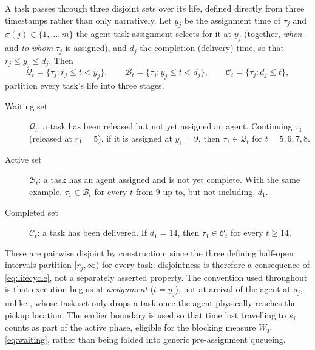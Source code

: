 \documentclass[../main.tex]{subfiles}
\begin{document}
A task passes through three disjoint sets over its life, defined directly from %
three timestamps rather than only narratively. Let $y_j$ be the assignment time
of $\tau_j$ and $\sigma(j) \in \{1,\dots,m\}$ the agent task assignment
selects for it at $y_j$ (together, \emph{when} and \emph{to whom} $\tau_j$
is assigned), and $d_j$ the completion (delivery) time, so that
$r_j \le y_j \le d_j$. Then
\begin{equation}
  \mathcal{Q}_t = \{\tau_j : r_j \le t < y_j\}, \qquad
  \mathcal{B}_t = \{\tau_j : y_j \le t < d_j\}, \qquad
  \mathcal{C}_t = \{\tau_j : d_j \le t\},
  \label{eq:lifecycle}
\end{equation}
partition every task's life into three stages.
\begin{description}
  \item[Waiting set] $\mathcal{Q}_t$: a task has been released but not yet
    assigned an agent. Continuing $\tau_1$ (released at $r_1 = 5$), if it is
    assigned at $y_1 = 9$, then $\tau_1 \in \mathcal{Q}_t$ for
    $t = 5, 6, 7, 8$.
  \item[Active set] $\mathcal{B}_t$: a task has an agent assigned and is
    not yet complete. With the same example, $\tau_1 \in \mathcal{B}_t$ for
    every $t$ from $9$ up to, but not including, $d_1$.
  \item[Completed set] $\mathcal{C}_t$: a task has been delivered. If
    $d_1 = 14$, then $\tau_1 \in \mathcal{C}_t$ for every $t \ge 14$.
\end{description}
These are pairwise disjoint by construction, since the three defining
half-open intervals partition $[r_j, \infty)$ for every task: disjointness
is therefore a consequence of \eqref{eq:lifecycle}, not a separately
asserted property. The convention used throughout is that execution begins %
at \emph{assignment} ($t = y_j$), not at arrival of the agent at $s_j$,
unlike \citet{ma2017lifelong}, whose task set only drops a task once the
agent physically reaches the pickup location. The earlier boundary is used
so that time lost travelling to $s_j$ counts as part of the active phase,
eligible for the blocking measure $W_T$ \eqref{eq:waiting}, rather than
being folded into generic pre-assignment queueing.
\end{document}
